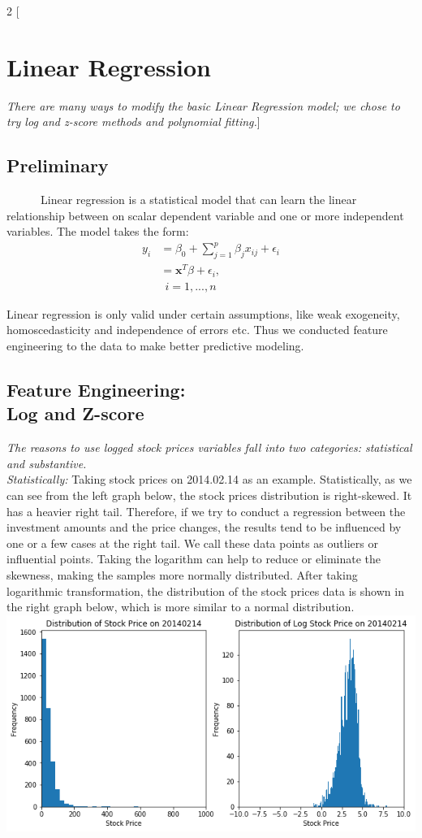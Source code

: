 \documentclass{article}
\begin{document}
\begin{multicols}{2}
[\section*{Linear Regression}\textit{ There are many ways to modify the basic Linear Regression model; we chose to try log and z-score methods and polynomial fitting.}]
\subsection*{Preliminary}
  
\ \ \ \ \ \ Linear regression is a statistical model that can learn the linear relationship between on scalar dependent variable and one or more independent variables. The model takes the form:
\begin{align*}
y_i&=\beta_0+\sum_{j=1}^p\beta_{j}x_{ij}+\epsilon_{i}\\
&=\textbf{x}^T{\beta}+\epsilon_i,\\
&\ \ i=1,...,n
\end{align*}

Linear regression is only valid under certain assumptions, like weak exogeneity, homoscedasticity and independence of errors etc. Thus we conducted feature engineering to the data to make better predictive modeling.
\subsection*{Feature Engineering: \\Log and Z-score}
\textit{The reasons to use logged stock prices variables fall into two categories: statistical and substantive.}\\ 

\textit{Statistically: }Taking stock prices on 2014.02.14 as an example. Statistically, as we can see from the left graph below, the stock prices distribution is right-skewed. It has a heavier right tail. Therefore, if we try to conduct a regression between the investment amounts and the price changes, the results tend to be influenced by one or a few cases at the right tail. We call these data points as outliers or influential points. Taking the logarithm can help to reduce or eliminate the skewness, making the samples more normally distributed. After taking logarithmic transformation, the distribution of the stock prices data is shown in the right graph below, which is more similar to a normal distribution. 
\includegraphics[scale=.35]{stockdis.png}\\ 


\end{multicols}
\end{document}
